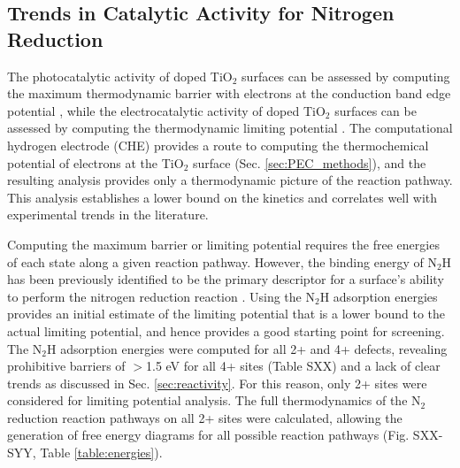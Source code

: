 
\subsection{Trends in Catalytic Activity for Nitrogen Reduction}
\label{sec:cat_trends}
The photocatalytic activity of doped TiO$_2$ surfaces can be assessed by computing the maximum thermodynamic barrier with electrons at the conduction band edge potential \cite{Comer_2018}, while the electrocatalytic activity of doped TiO$_2$ surfaces can be assessed by computing the thermodynamic limiting potential \cite{Norskov_2004,Garc_a_Mota_2011}. The computational hydrogen electrode (CHE) provides a route to computing the thermochemical potential of electrons at the TiO$_2$ surface (Sec. \ref{sec:PEC_methods}), and the resulting analysis provides only a thermodynamic picture of the reaction pathway. This analysis establishes a lower bound on the kinetics and correlates well with experimental trends in the literature\cite{Seh_2017}.

Computing the maximum barrier or limiting potential requires the free energies of each state along a given reaction pathway. However, the binding energy of N$_2$H has been previously identified to be the primary descriptor for a surface's ability to perform the nitrogen reduction reaction \cite{Hoskuldsson_2017, Montoya_2015}. Using the N$_2$H adsorption energies provides an initial estimate of the limiting potential that is a lower bound to the actual limiting potential, and hence provides a good starting point for screening. The N$_2$H adsorption energies were computed for all 2+ and 4+ defects, revealing prohibitive barriers of $>$1.5 eV for all 4+ sites (Table SXX) and a lack of clear trends as discussed in Sec. \ref{sec:reactivity}. For this reason, only 2+ sites were considered for limiting potential analysis. %
The full thermodynamics of the N$_2$ reduction reaction pathways on all 2+ sites were calculated, allowing the generation of free energy diagrams for all possible reaction pathways (Fig. SXX-SYY, Table \ref{table:energies}). 
 



